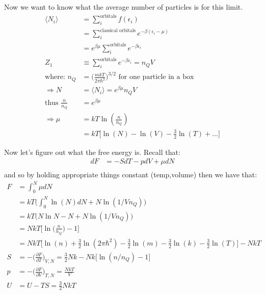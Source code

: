 \documentclass[a4paper, 11pt]{article}
\begin{document}
	\noindent Now we want to know what the average number of particles is for this limit. 
		\begin{align*}
			\langle N_i \rangle &= \sum\limits_i^{\text{orbitals}} f(\epsilon_i) \\ 
				&= \sum\limits_i^{\text{classical orbitals}} e^{-\beta(\epsilon_i-\mu)}\\
				&= e^{\beta \mu}\sum\limits_i^{\text{orbitals}}e^{-\beta\epsilon_i}\\
			Z_1 &\equiv \sum_i^{\text{orbitals}} e^{-\beta\epsilon_i} = n_Q V\\ 
			\text{where: } n_Q &= \Big(\frac{mkT}{2\pi\hbar^2}\Big)^{3/2} \text{ for one particle in a box}\\ 
			\Rightarrow N &= \langle N_i \rangle = e^{\beta \mu}n_QV \\ 
			\text{thus } \frac{n}{n_Q} &= e^{\beta \mu} \\ 
			\Rightarrow \mu &=  kT\ln(\frac{n}{n_Q})\\
				&= kT\Big[\ln(N)-\ln(V)-\frac{3}{2}\ln(T)+...\Big]
		\end{align*}
	
	\noindent Now let's figure out what the free energy is. Recall that: 
		\begin{align*}
			dF &= -SdT-pdV+\mu dN \\ 
		\end{align*}
	\noindent and so by holding appropriate things constant (temp,volume) then we have that: 
		\begin{align*}
			F &= \int_0^N \mu dN \\ 
				&= kT\Big(\int_0^N \ln(N)dN+N\ln(1/Vn_Q)\Big)\\
				&= kT\Big(N\ln N -N + N\ln(1/Vn_Q)\Big) \\ 
				&= NkT\Big[\ln\Big(\frac{n}{n_Q}\Big)-1\Big]\\
				&= NkT\Big[\ln(n)+\frac{3}{2}\ln(2\pi\hbar^2)-\frac{3}{2}\ln(m)-\frac{3}{2}\ln(k)-\frac{3}{2}\ln(T)\Big]-NkT\\
			S &= -\Big(\frac{\partial F}{\partial T}\Big)_{V,N} = \frac{3}{2}Nk-Nk\Big[\ln(n/n_Q)-1\Big] \\
			p &= -\Big(\frac{\partial F}{\partial V}\Big)_{T,N} = \frac{NkT}{V} \\ 
			U &= U-TS = \frac{3}{2}NkT
		\end{align*}
	
	
	
	
	
	
	
	
	
	
	
	
	
	
	
	
	
	
\end{document}
